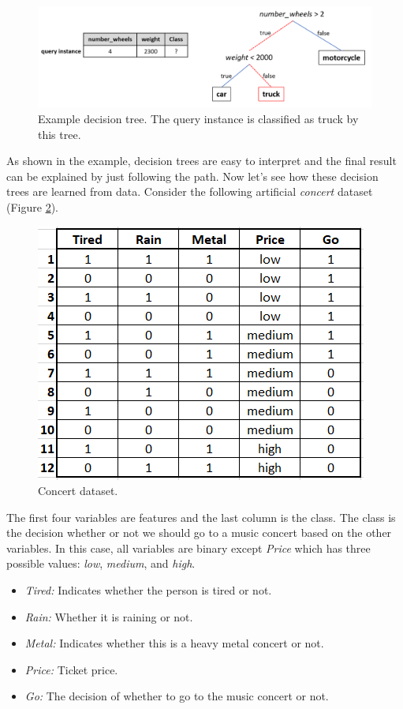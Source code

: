 \documentclass[
  11pt,
]{krantz}
\providecommand{\tightlist}{%
  \setlength{\itemsep}{0pt}\setlength{\parskip}{0pt}}
\begin{document}
\begin{figure}

{\centering \includegraphics[width=0.9\linewidth]{images/treeExample} 

}

\caption{Example decision tree. The query instance is classified as truck by this tree.}\label{fig:treeExample}
\end{figure}

As shown in the example, decision trees are easy to interpret and the final result can be explained by just following the path. Now let's see how these decision trees are learned from data. Consider the following artificial \emph{concert} dataset (Figure \ref{fig:concertTable}).

\begin{figure}

{\centering \includegraphics[width=0.6\linewidth]{images/concertTable} 

}

\caption{Concert dataset.}\label{fig:concertTable}
\end{figure}

The first four variables are features and the last column is the class. The class is the decision whether or not we should go to a music concert based on the other variables. In this case, all variables are binary except \emph{Price} which has three possible values: \emph{low}, \emph{medium}, and \emph{high}.

\begin{itemize}
\tightlist
\item
  \emph{Tired:} Indicates whether the person is tired or not.
\item
  \emph{Rain:} Whether it is raining or not.
\item
  \emph{Metal:} Indicates whether this is a heavy metal concert or not.
\item
  \emph{Price:} Ticket price.
\item
  \emph{Go:} The decision of whether to go to the music concert or not.
\end{itemize}
\end{document}
